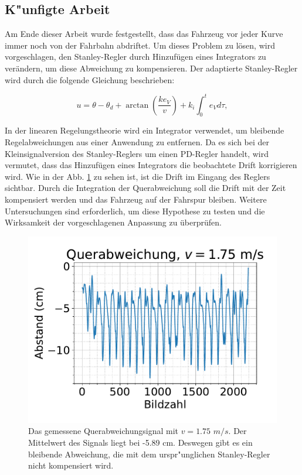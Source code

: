 \documentclass[arbeit=studie,oneside,BCOR=12mm]{ArbeitRST}
\begin{document}
\subsection{K"unfigte Arbeit}

Am Ende dieser Arbeit wurde festgestellt, dass das Fahrzeug vor jeder Kurve
immer noch von der Fahrbahn abdriftet. Um dieses Problem zu lösen, wird
vorgeschlagen, den Stanley-Regler durch Hinzufügen eines Integrators zu
verändern, um diese Abweichung zu kompensieren. Der adaptierte Stanley-Regler
wird durch die folgende Gleichung beschrieben:

\begin{equation}
    u = \theta - \theta_d + \arctan\left(\frac{ke_{V}}{v}\right) + k_{i} \int_{0}^{t} e_{V}d\tau,
    \label{eq:Stanley-Regler-adjusted}
\end{equation}

In der linearen Regelungstheorie wird ein Integrator verwendet, um bleibende
Regelabweichungen aus einer Anwendung zu entfernen. Da es sich bei der
Kleinsignalversion des Stanley-Reglers um einen PD-Regler handelt, wird
vermutet, dass das Hinzufügen eines Integrators die beobachtete Drift
korrigieren wird. Wie in der Abb. \ref{quer} zu sehen ist, ist die Drift im Eingang
des Reglers sichtbar. Durch die Integration der Querabweichung soll die Drift
mit der Zeit kompensiert werden und das Fahrzeug auf der Fahrspur bleiben.
Weitere Untersuchungen sind erforderlich, um diese Hypothese zu testen und die
Wirksamkeit der vorgeschlagenen Anpassung zu überprüfen.

\begin{figure}[h]
    \centering
    \includegraphics[scale=0.7]{querabweichung}
    \caption{Das gemessene Querabweichungsignal mit $v = 1.75$ $m/s$. Der Mittelwert
    des Signals liegt bei -5.89 cm. Deswegen gibt es ein bleibende Abweichung, die 
    mit dem urspr"unglichen Stanley-Regler nicht kompensiert wird.}
    \label{quer}
\end{figure}

\printbibliography
\end{document}
